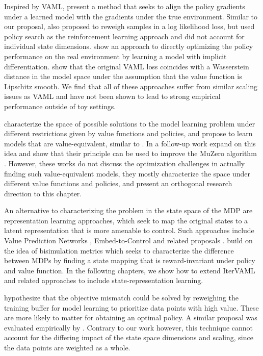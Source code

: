 Inspired by VAML, \textcite{abachi2020policy} present a method that seeks to align the policy gradients under a learned model with the gradients under the true environment. Similar to our proposal, \textcite{doro2020gradient} also proposed to reweigh samples in a log likelihood loss, but used policy search as the reinforcement learning approach and did not account for individual state dimensions. \textcite{nikishin2021control} show an approach to directly optimizing the policy performance on the real environment by learning a model with implicit differentiation. \textcite{asadi2018equivalence} show that the original VAML loss coincides with a Wasserstein distance in the model space under the assumption that the value function is Lipschitz smooth. We find that all of these approaches suffer from similar scaling issues as VAML and have not been shown to lead to strong empirical performance outside of toy settings.

\textcite{grimm2020value} characterize the space of possible solutions to the model learning problem under different restrictions given by value functions and policies, and propose to learn models that are value-equivalent, similar to \textcite{vaml}. In a follow-up work \textcite{grimm2021proper} expand on this idea and show that their principle can be used to improve the MuZero algorithm \parencite{schrittwieser2020mastering}. However, these works do not discuss the optimization challenges in actually finding such value-equivalent models, they mostly characterize the space under different value functions and policies, and present an orthogonal research direction to this chapter.

An alternative to characterizing the problem in the state space of the MDP are representation learning approaches, which seek to map the original states to a latent representation that is more amenable to control. Such approaches include Value Prediction Networks \parencite{oh2017value}, Embed-to-Control \parencite{10.5555/2969442.2969546} and related proposals \parencite{levine2020prediction,cui2021controlaware}. \textcite{zhang2021learning} build on the idea of bisimulation metrics \parencite{ferns2004metrics,ferns2011bisimulation} which seeks to characterize the difference between MDPs by finding a state mapping that is reward-invariant under policy and value function. 
In the following chapters, we show how to extend IterVAML and related approaches to include state-representation learning.

\textcite{lambert202objective} hypothesize that the objective mismatch could be solved by reweighing the training buffer for model learning to prioritize data points with high value. These are more likely to matter for obtaining an optimal policy. A similar proposal was evaluated empirically by \textcite{nair2020goal}. Contrary to our work however, this technique cannot account for the differing impact of the state space dimensions and scaling, since the data points are weighted as a whole.


